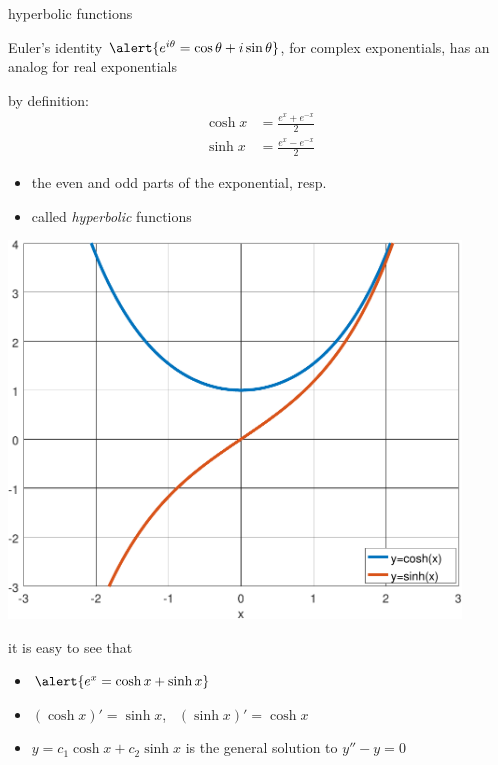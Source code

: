 \documentclass{beamer}
\begin{document}
\begin{frame}{hyperbolic functions}

\begin{itemize}
\item Euler's identity $\alert{e^{i\theta}=\cos\theta+i\sin\theta}$, for complex exponentials, has an analog for real exponentials

\noindent \begin{minipage}[t]{0.45\textwidth}
\item by definition:
\begin{align*}
\cosh x &= \frac{e^x + e^{-x}}{2} \\
\sinh x &= \frac{e^x - e^{-x}}{2}
\end{align*}

\vspace{-5mm}
    \begin{itemize}
    \item the even and odd parts of the exponential, resp.
    \item called \emph{hyperbolic} functions
    \end{itemize}
\end{minipage}
\begin{minipage}[t]{0.46\textwidth}
\vspace{5mm}

\hfill \includegraphics[width=0.9\textwidth]{figs/coshsinh}
\end{minipage}

\bigskip
\item it is easy to see that
    \begin{itemize}
    \item $\alert{e^x = \cosh x + \sinh x}$
    \item $(\cosh x)' = \sinh x$, \, $(\sinh x)' = \cosh x$
    \item $y=c_1 \cosh x + c_2 \sinh x$ is the general solution to $y''-y=0$
    \end{itemize}
\end{itemize}
\end{frame}
\end{document}
